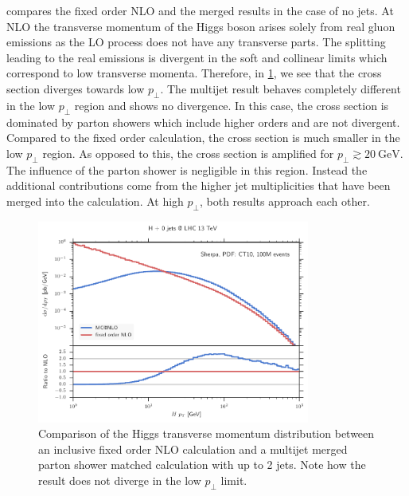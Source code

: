  compares the fixed order NLO and the merged \mcatnlo{} results in the case of no jets.
At NLO the transverse momentum of the Higgs boson arises solely from real gluon emissions as the LO process does not have any transverse parts.
The splitting leading to the real emissions is divergent in the soft and collinear limits which correspond to low transverse momenta.
Therefore, in \cref{fig:h_hpt_nominal}, we see that the cross section diverges towards low $p_\perp$.
The multijet result behaves completely different in the low $p_\perp$ region and shows no divergence.
In this case, the cross section is dominated by parton showers which include higher orders and are not divergent.
Compared to the fixed order calculation, the cross section is much smaller in the low $p_\perp$ region.
As opposed to this, the cross section is amplified for $p_\perp \gtrsim \SI{20}{\giga\electronvolt}$.
The influence of the parton shower is negligible in this region.
Instead the additional contributions come from the higher jet multiplicities that have been merged into the calculation.
At high $p_\perp$, both results approach each other.
%
\begin{figure}
	\centering
	\includegraphics[width=0.8\textwidth]{images/h_hpt_nominal.pdf}
	\caption{Comparison of the Higgs transverse momentum distribution between an inclusive fixed order NLO calculation and a multijet merged parton shower matched \mcatnlo{} calculation with up to 2 jets.
	Note how the \mcatnlo{} result does not diverge in the low $p_\perp$ limit.}
	\label{fig:h_hpt_nominal}
\end{figure}
%

